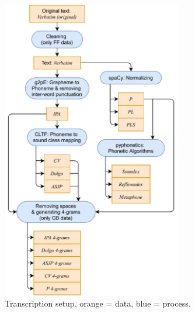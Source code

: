 \begin{figure}
  \centering
  \includegraphics[width=0.7\textwidth]{figures/transcription}
  \caption{Transcription setup, orange = data, blue = process.}
  \label{fig:transcription}
\end{figure}


